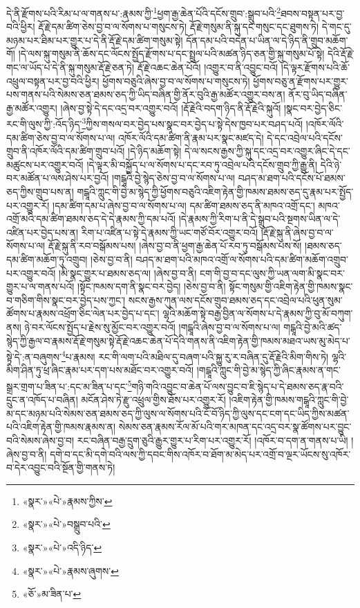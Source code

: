 དེ་ནི་རྫོགས་པའི་རིམ་པ་ལ་གནས་པ་:རྣམས་ཀྱི་\footnote{«སྣར་»«པེ་»རྣམས་ཀྱིས་}ཕྱག་རྒྱ་ཆེན་པོའི་དངོས་གྲུབ་:སྒྲུབ་པའི་\footnote{«སྣར་»«པེ་»བསྒྲུབ་པའི་}ཐབས་བསྟན་པར་བྱ་བའི་ཕྱིར། རྡོ་རྗེ་དམ་ཚིག་ཅེས་བྱ་བ་ལ་སོགས་པ་གསུངས་ཏེ། རྡོ་རྗེ་གསུམ་ནི་སྐུ་དང་གསུང་དང་ཐུགས་ཏེ། དེ་གང་དུ་མཉམ་པར་ཐིམ་པར་གྱུར་པ་དེ་ནི་རྡོ་རྗེ་དམ་ཚིག་གསུམ་སྟེ། དོན་དམ་པའི་བདེན་པ་ཡིན་ལ་དེ་ཉིད་ནི་གྲུབ་མཆོག་གོ། །དེ་ལས་སྐུ་གསུམ་ནི་ཆོས་དང་ལོངས་སྤྱོད་རྫོགས་པ་དང་སྤྲུལ་པའི་མཚན་ཉིད་ཅན་གྱི་སྐུ་གསུམ་པོ་སྟེ། དེའི་རྡོ་རྗེ་གང་ལ་ཡོད་པ་དེ་ནི་སྐུ་གསུམ་རྡོ་རྗེ་ཅན་ཏེ། རྡོ་རྗེ་འཆང་ཆེན་པོའོ། །འགྱུར་བ་ནི་འབྱུང་བའོ། །དེ་ལྟར་རྫོགས་པའི་ཆོ་འཕྲུལ་བསྟན་པར་བྱ་བའི་ཕྱིར། ཕྱོགས་བཅུའི་ཞེས་བྱ་བ་ལ་སོགས་པ་གསུངས་ཏེ། ཕྱོགས་བཅུ་ན་རྫོགས་པར་གྱུར་པས་གནས་པའི་སེམས་ཅན་ཐམས་ཅད་ཀྱི་ཡིད་བཞིན་གྱི་ནོར་བུའི་རྒྱ་མཚོར་འགྱུར་བས་ན། ནོར་བུ་ཡིད་བཞིན་རྒྱ་མཚོར་འགྱུར། །ཞེས་བྱ་སྟེ་དེ་དང་འདྲ་བར་འགྱུར་བའོ། །རྡོ་རྗེའི་བདག་ཉིད་ནི་རྡོ་རྗེའི་སྐུའོ། །སྣང་བར་བྱེད་ཅིང་རང་གི་ལུས་ཀྱི་:འོད་ཉིད་\footnote{«སྣར་»«པེ་»འདི་ཉིད་}ཀྱིས་གསལ་བར་བྱེད་པས་སྣང་བར་བྱེད་པ་སྟེ་དེས་ཁྱབ་པར་བཤད་པའོ། །འཁོར་ལོའི་དམ་ཚིག་ཅེས་བྱ་བ་ལ་སོགས་པ་ལ། འཁོར་ལོའི་དམ་ཚིག་ནི་རྣམ་པར་སྣང་མཛད་དེ། དེ་དང་འབྲེལ་པའི་དངོས་གྲུབ་ནི་འཁོར་ལོའི་དམ་ཚིག་གྲུབ་པའོ། །དེ་ཉིད་མཆོག་སྟེ། དེ་ལ་སངས་རྒྱས་ཀྱི་སྐུ་དང་འདྲ་བར་འགྱུར་ཞིང་དེ་དང་མཚུངས་པར་འགྱུར་བའོ། །དེ་ལྟར་མི་བསྐྱོད་པ་ལ་སོགས་པ་དང་རབ་ཏུ་འབྲེལ་པའི་དངོས་གྲུབ་ཀྱི་རྒྱུ་ནི། དེའི་ཉེ་བར་མཚོན་པ་ལས་ཤེས་པར་བྱའོ། །གངྒཱའི་བྱེ་སྙེད་ཅེས་བྱ་བ་ལ་སོགས་པ་ལ། བཤད་མ་ཐག་པའི་དངོས་པོ་ཐམས་ཅད་ཀྱིས་གྲུབ་པས་ན། གངྒཱའི་ཀླུང་གི་བྱེ་མ་སྙེད་ཀྱི་ཕྱོགས་བཅུའི་འཇིག་རྟེན་གྱི་ཁམས་ཐམས་ཅད་དུ་རྣམ་པར་སྤྱོད་པར་འགྱུར་རོ། །དམ་ཚིག་དམ་པ་ཞེས་བྱ་བ་ལ་སོགས་པ་ལ། དམ་ཚིག་ཐམས་ཅད་ནི་མཁའ་འགྲོ་དང་། མཁའ་འགྲོ་མའི་དམ་ཚིག་ཐམས་ཅད་དེ་དེ་རྣམས་ཀྱི་དམ་པའོ། །དེ་རྣམས་ཀྱི་རིག་པ་ནི་དེ་སྒྲུབ་པའི་སྔགས་ཡིན་ལ་དེ་འཛིན་པར་བྱེད་པས་ན། རིག་པ་འཛིན་པ་སྟེ་དེ་རྣམས་ཀྱི་ཡང་གཙོ་བོར་འགྱུར་བའོ། །རྡོ་རྗེ་སྐུ་ནི་ཞེས་བྱ་བ་ལ་སོགས་པ་ལ། རྡོ་རྗེ་སྐུ་ནི་རབ་བསྒོམས་པས། །ཞེས་བྱ་བ་ནི་ཕྱག་རྒྱ་ཆེན་པོ་རབ་ཏུ་བསྒོམས་པས་སོ། །ཐམས་ཅད་དམ་ཚིག་མཆོག་ཏུ་འགྲུབ། །ཅེས་བྱ་བ་ནི། བཤད་མ་ཐག་པའི་མཁའ་འགྲོ་ལ་སོགས་པའི་དམ་ཚིག་མཆོག་འགྲུབ་པར་འགྱུར་བའོ། །མི་སྣང་གྱུར་པ་ཐམས་ཅད་ལ། །ཞེས་བྱ་བ་ནི། ངག་གི་བྱ་བ་དང་ལུས་ཀྱི་ཡན་ལག་མི་སྣང་བར་གྱུར་པ་ལ་གནས་པའོ། །སྟོང་ཁམས་དག་ནི་སྣང་བར་བྱེད། །ཅེས་བྱ་བ་ནི། སྟོང་གསུམ་གྱི་འཇིག་རྟེན་གྱི་ཁམས་སྣང་བ་གཅིག་གིས་སྣང་བར་བྱེད་པས་ཀྱང་། སངས་རྒྱས་ཀུན་ལས་དངོས་གྲུབ་ཐམས་ཅད་དང་འབྲེལ་པའི་ཕུན་སུམ་ཚོགས་པ་རྣམས་འཕྲོག་ཅིང་ལེན་པར་བྱེད་པ་དང་། ལྷའི་མཆོག་སྟེ་བརྒྱ་བྱིན་ལ་སོགས་པ་དེ་རྣམས་ཀྱི་བུ་མོ་བཀུག་ནས། ཉེ་བར་ལོངས་སྤྱོད་པ་རྗེས་སུ་མྱོང་བར་འགྱུར་བའོ། །གངྒཱའི་ཞེས་བྱ་བ་ལ་སོགས་པ་ལ། གངྒཱའི་བྱེ་མའི་ཚད་སྙེད་ཀྱི་རྒྱལ་བ་རྣམས་རྡོ་རྗེ་གསུམ་སྟེ་རྡོ་རྗེ་འཆང་ཆེན་པོ་དེའི་གནས་ནི་འཇིག་རྟེན་གྱི་ཁམས་མཐའ་ཡས་མུ་མེད་པ་སྟེ་དེ་:ན་བཞུགས་\footnote{«སྣར་»«པེ་»རྣམས་ཞུགས་}པ་རྣམས། རང་གི་ལག་པའི་མཐིལ་དུ་བཞག་པའི་སྐྱུ་རུ་ར་བཞིན་དུ་རྡོ་རྗེའི་མིག་གིས་ཏེ། ལྷའི་མིག་ཤིན་ཏུ་ཕྲ་ཞིང་རྣམ་པར་དག་པས་མཐོང་བར་འགྱུར་བའོ། །གངྒཱའི་ཀླུང་གི་བྱེ་མ་སྙེད་ཀྱི་ཞིང་རྣམས་ན་གང་སྒྲར་གྲག་པ་ཟིན་པ་:དང་མ་ཟིན་པ་དང་\footnote{«ཅོ་»མ་ཟིན་པ་}གཉི་གའི་འབྱུང་བ་ཆེན་པོ་ལས་བྱུང་བ་ཇི་སྙེད་པ་དེ་ཐམས་ཅད་རྣ་བའི་དྲུང་ན་འཁོད་པ་བཞིན། མངོན་ཤེས་ཏེ་རྫུ་འཕྲུལ་གྱིས་ཐོས་པར་འགྱུར་རོ། །འཇིག་རྟེན་གྱི་ཁམས་གངྒཱའི་ཀླུང་གི་བྱེ་མ་དང་མཉམ་པའི་སེམས་ཅན་ཐམས་ཅད་ཀྱི་ལུས་ལ་སོགས་པའི་ངོ་བོ་ཉིད་ཀྱི་ལུས་དང་ངག་དང་ཡིད་ཀྱིས་མཚན་པའི་འཇིག་རྟེན་གྱི་ཁམས་རྣམས་ན། སེམས་ཅན་རྣམས་རོལ་མོ་པའི་གར་མཁན་དང་འདྲ་བར་སྣ་ཚོགས་པར་བྱུང་བའི་སེམས་ཞེས་བྱ་བ། རང་བཞིན་བརྒྱ་དྲུག་ཅུའི་རྒྱུར་གྱུར་པ་རིག་པར་འགྱུར་རོ། །འཁོར་བ་དག་ན་གནས་པ་ཡི། །ཞེས་བྱ་བ་ནི། དགེ་བ་དང་མི་དགེ་བའི་ལས་ཀྱི་དབང་གིས་འཁོར་བ་ཐོག་མ་མེད་པར་འགྲོ་བ་ལྔར་ཡོངས་སུ་འཁོར་བ་དེར་འབྱུང་བའི་སྔོན་གྱི་གནས་ཏེ། 
